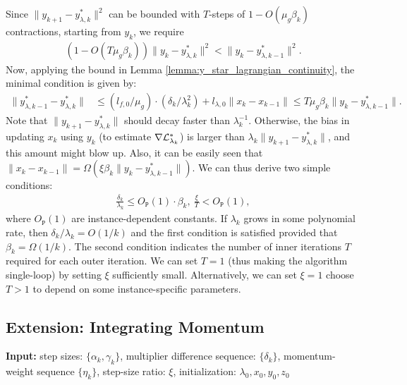 Since $\|y_{k+1} - y_{\lambda, k}^*\|^2$ can be bounded with $T$-steps of $1 - O(\mu_g \beta_k)$ contractions, starting from $y_k$, we require 
\begin{align*}
    \left(1 - O(T \mu_g \beta_k) \right) \|y_k - y_{\lambda, k}^*\|^2 < \|y_k - y_{\lambda, k-1}^*\|^2.
\end{align*}
Now, applying the bound in Lemma \ref{lemma:y_star_lagrangian_continuity}, the minimal condition is given by:
\begin{align*}
    \|y_{\lambda, k-1}^* - y_{\lambda,k}^*\| &\le (l_{f,0} / \mu_g) \cdot (\delta_k / \lambda_k^2) + l_{\lambda,0} \|x_{k} - x_{k-1}\| \le  T \mu_g \beta_k \| y_{k} - y_{\lambda, k-1}^* \|.
\end{align*}
Note that $\|y_{k+1} - y_{\lambda, k}^*\|$ should decay faster than $\lambda_k^{-1}$. Otherwise, the bias in updating $x_k$ using $y_k$ (to estimate $\nabla \mathcal{L}_{\lambda_k}^*$) is larger than $\lambda_k \|y_{k+1} - y_{\lambda,k}^*\|$, and this amount might blow up. Also, it can be easily seen that $\|x_{k} - x_{k-1}\| = \Omega(\xi \beta_k \|y_{k} - y_{\lambda,k-1}^*\|)$. 
We can thus derive two simple conditions:
\begin{align*}
    \frac{\delta_k}{\lambda_k} \le O_{\texttt{P}} (1) \cdot \beta_k, \ \frac{\xi}{T} < O_{\texttt{P}} (1),
\end{align*}
where $O_{\texttt{P}}(1)$ are instance-dependent constants. If $\lambda_k$ grows in some polynomial rate, then $\delta_k / \lambda_k = O(1/k)$ and the first condition is satisfied provided that $\beta_k = \Omega(1/k)$. 
The second condition indicates the number of inner iterations $T$ required for each outer iteration. 
We can set $T=1$ (thus making the algorithm single-loop) by setting $\xi$ sufficiently small.
Alternatively, we can set $\xi = 1$ choose $T>1$ to depend on some instance-specific parameters.


\subsection{Extension: Integrating Momentum}
\begin{algorithm}[t]
    \caption{\algnametwo}
    \label{algo:algo_name2}
    
    {{\bf Input:} step sizes: $\{\alpha_k, \gamma_k\}$, multiplier difference sequence: $\{\delta_k\}$, momentum-weight sequence $\{\eta_k\}$, step-size ratio: $\xi$, initialization: $\lambda_0, x_0, y_0, z_0$}
    \begin{algorithmic}[1]
        \ENDFOR
    \end{algorithmic}
\end{algorithm}


